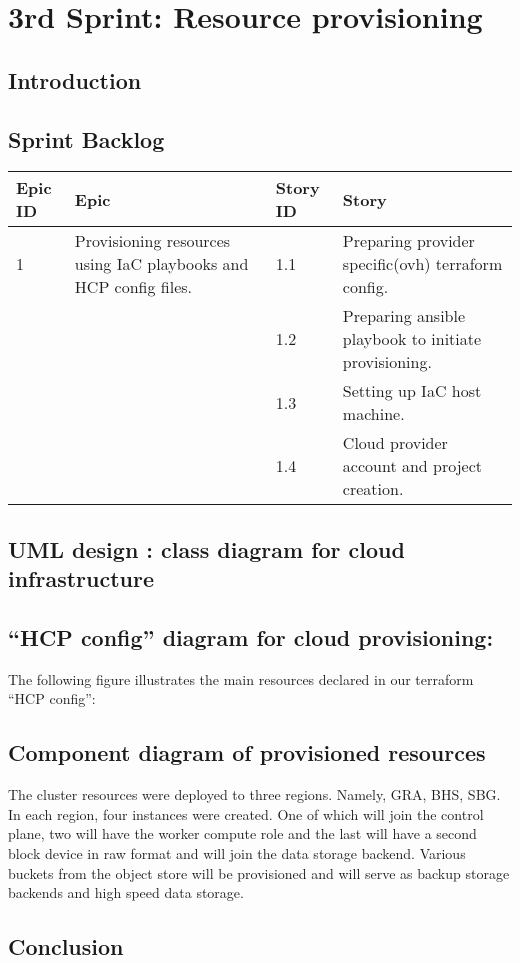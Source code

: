 \graphicspath{{./assets/}}
\setcounter{mtc}{5}
\chapter{3rd Sprint: Resource provisioning  }

\minitoc
\newpage
\section*{Introduction}



\section{Sprint Backlog}


\begin{longtable}[!ht]{|m{1.5cm}|m{3cm}|m{1.5cm}|m{9cm}|}
\hline
{\textbf{Epic ID}} & {\textbf{Epic}} & {\textbf{Story ID}} & {\textbf{Story}}\\
\hline
1  & Provisioning resources using IaC playbooks and HCP config files.  &  1.1	 & Preparing provider specific(ovh) terraform config. \\
\cline{3-4}
& & 1.2 & Preparing ansible playbook to initiate provisioning. \\
\cline{3-4}
& & 1.3	& Setting up IaC host machine.  \\
\cline{3-4}
& & 1.4	& Cloud provider account and project creation.  \\
\hline
\end{longtable}


\newpage

\section{UML design : class diagram for cloud infrastructure }


\section{“HCP config” diagram for cloud provisioning: }
The following figure illustrates the main resources declared in our terraform “HCP config”: 

\section{Component diagram of provisioned resources}

The cluster resources were deployed to three regions. Namely, GRA, BHS, SBG. In each region, four instances were created. One of which will join the control plane, two will have the worker compute role and the last will have a second block device in raw format and will join the data storage backend. Various buckets from the object store will be provisioned and will serve as backup storage backends and high speed data storage.  
\newpage


\section*{Conclusion}
